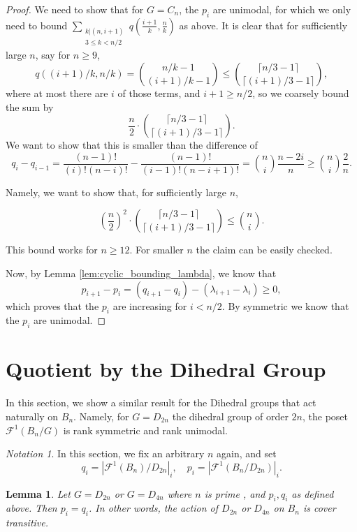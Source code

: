 \documentclass{amsart}
\newtheorem{lem}[thm]{Lemma}
\theoremstyle{remark}
\newtheorem{note}[thm]{Notation}
\newcommand{\dstyle}{\displaystyle}
\begin{document}
\begin{proof}

We need to show that for $G= C_n$, the $p_i$ are unimodal, for which we only need to bound $ \dstyle \sum_{\substack{k | (n , i+1)\\ 3 \le k < n/2 }} q (\frac{i+1}{k}, \frac{n}{k}) $ as above. It is clear that for sufficiently large $n$, say for $n \ge 9$, $$q((i+1)/k, n/k) = {n/k - 1 \choose (i+1)/k -1} \le {\lceil n/3-1 \rceil \choose \lceil (i+1)/3 -1 \rceil },$$ where at most there are $i$ of those terms, and $ i+1 \ge n/2$, so we coarsely bound the sum by $$\frac{n}{2} \cdot {\lceil n/3-1 \rceil \choose \lceil (i+1)/3 -1 \rceil }. $$ We want to show that this is smaller than the difference of $$q_i - q_{i-1} = \frac{(n-1)!}{(i)! (n-i)!} - \frac{(n-1)!}{(i-1)!(n-i+1)!}= {n \choose i } \frac{n-2i}{n} \ge  {n \choose i } \frac{2}{n} .$$

Namely, we want to show that, for sufficiently large $n$, 

$$ \left(\frac{n}{2}\right)^2 \cdot {\lceil n/3-1 \rceil \choose \lceil (i+1)/3 -1 \rceil }  \le   {n \choose i}.$$

This bound works for $n \ge 12$. For smaller $n$ the claim can be easily checked. 

Now, by Lemma \ref{lem:cyclic_bounding_lambda}, we know that $$p_{i+1} - p_{i} =  (q_{i+1} - q_i) - (\lambda_{i+1}- \lambda_i) \ge 0,$$  which proves that the $p_i$ are increasing for $i < n/2$. By symmetric we know that the $p_i$ are unimodal.

\end{proof}


\section{Quotient by the Dihedral Group}
\label{sec:dihedral}

In this section, we show a similar result for the Dihedral groups that act naturally on $B_n$. Namely, for $G = D_{2n}$ the dihedral group of order $2n$, the poset $\mathcal F^1(B_n/G)$ is rank symmetric and rank unimodal.


\begin{note} In this section, we fix an arbitrary $n$ again, and set $$q_i = |\mathcal F^1 (B_n)/D_{2n}|_{i}, \quad p_i = |\mathcal F^1(B_n/D_{2n})|_{i}. $$ 
\end{note}


\begin{lem}{\label{lem:dihedral_prime}}
Let $G = D_{2n}$ or $G = D_{4n}$ where $n$ is prime , and $p_i, q_i$ as defined above. Then $p_i = q_i$. In other words, the action of $D_{2n}$ or $D_{4n}$ on $B_n$ is cover transitive. 
\end{lem}
\end{document}
